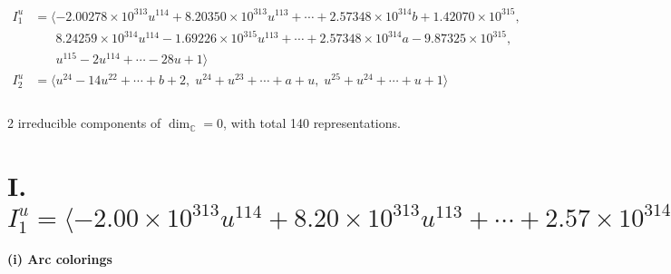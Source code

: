 \documentclass[1p]{elsarticle_modified}
\theoremstyle{definition}
\begin{document}
\begin{align*}
I^u_{1}&=\langle 
-2.00278\times10^{313} u^{114}+8.20350\times10^{313} u^{113}+\cdots+2.57348\times10^{314} b+1.42070\times10^{315},\\
\phantom{I^u_{1}}&\phantom{= \langle  }8.24259\times10^{314} u^{114}-1.69226\times10^{315} u^{113}+\cdots+2.57348\times10^{314} a-9.87325\times10^{315},\\
\phantom{I^u_{1}}&\phantom{= \langle  }u^{115}-2 u^{114}+\cdots-28 u+1\rangle \\
I^u_{2}&=\langle 
u^{24}-14 u^{22}+\cdots+b+2,\;u^{24}+u^{23}+\cdots+a+u,\;u^{25}+u^{24}+\cdots+u+1\rangle \\
\\
\end{align*}
\raggedright * 2 irreducible components of $\dim_{\mathbb{C}}=0$, with total 140 representations.\\
\newpage
\renewcommand{\arraystretch}{1}
\centering \section*{I. $I^u_{1}= \langle -2.00\times10^{313} u^{114}+8.20\times10^{313} u^{113}+\cdots+2.57\times10^{314} b+1.42\times10^{315},\;8.24\times10^{314} u^{114}-1.69\times10^{315} u^{113}+\cdots+2.57\times10^{314} a-9.87\times10^{315},\;u^{115}-2 u^{114}+\cdots-28 u+1 \rangle$}
\flushleft \textbf{(i) Arc colorings}\\
\end{document}
